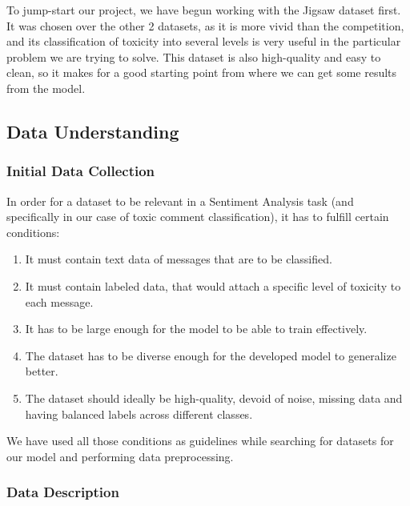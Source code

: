 \documentclass[]{article}
\begin{document}
	To jump-start our project, we have begun working with the Jigsaw dataset first. It was chosen over the other 2 datasets, as it is more vivid than the competition, and its classification of toxicity into several levels is very useful in the particular problem we are trying to solve. This dataset is also high-quality and easy to clean, so it makes for a good starting point from where we can get some results from the model.
	
	\subsection{Data Understanding}
	
	\subsubsection{Initial Data Collection}
	
	In order for a dataset to be relevant in a Sentiment Analysis task (and specifically in our case of toxic comment classification), it has to fulfill certain conditions:
	\begin{enumerate}
		\item It must contain text data of messages that are to be classified.
		\item It must contain labeled data, that would attach a specific level of toxicity to each message.
		\item It has to be large enough for the model to be able to train effectively.
		\item The dataset has to be diverse enough for the developed model to generalize better.
		\item The dataset should ideally be high-quality, devoid of noise, missing data and having balanced labels across different classes.
	\end{enumerate}
	We have used all those conditions as guidelines while searching for datasets for our model and performing data preprocessing.
	
	\subsubsection{Data Description}
	
\end{document}

